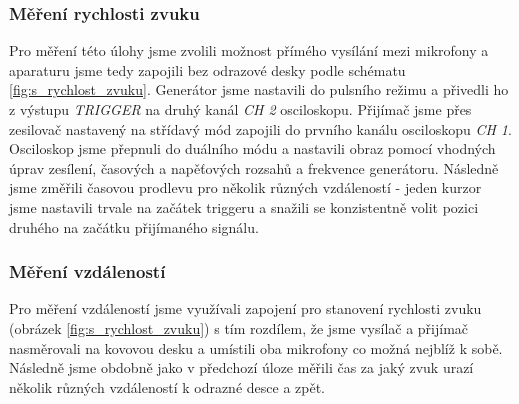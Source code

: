 \documentclass[english]{article}
\begin{document}
	\subsubsection{Měření rychlosti zvuku}
		Pro měření této úlohy jsme zvolili možnost přímého vysílání mezi mikrofony a aparaturu jsme tedy zapojili bez odrazové desky podle schématu \ref{fig:s_rychlost_zvuku}. Generátor jsme nastavili do pulsního režimu a přivedli ho z výstupu \emph{TRIGGER} na druhý kanál \emph{CH 2} osciloskopu. Přijímač jsme přes zesilovač nastavený na střídavý mód zapojili do prvního kanálu osciloskopu \emph{CH 1}. Osciloskop jsme přepnuli do duálního módu a nastavili obraz pomocí vhodných úprav zesílení, časových a napěťových rozsahů a frekvence generátoru. Následně jsme změřili časovou prodlevu pro několik různých vzdáleností - jeden kurzor jsme nastavili trvale na začátek triggeru a snažili se konzistentně volit pozici druhého na začátku přijímaného signálu.
	
	\subsubsection{Měření vzdáleností}
	    Pro měření vzdáleností jsme využívali zapojení pro stanovení rychlosti zvuku (obrázek \ref{fig:s_rychlost_zvuku}) s tím rozdílem, že jsme vysílač a přijímač nasměrovali na kovovou desku a umístili oba mikrofony co možná nejblíž k sobě. Následně jsme obdobně jako v předchozí úloze měřili čas za jaký zvuk urazí několik různých vzdáleností k odrazné desce a zpět.  
	
\end{document}

